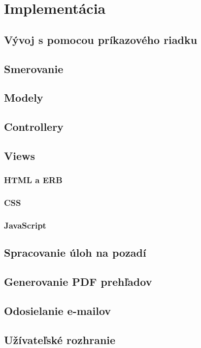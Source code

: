 \chapter{Implementácia}

\section{Vývoj s pomocou príkazového riadku}

\section{Smerovanie}

\section{Modely}

\section{Controllery}

\section{Views}
\subsection{HTML a ERB}
\subsection{CSS}
\subsection{JavaScript}

\section{Spracovanie úloh na pozadí}

\section{Generovanie PDF prehľadov}
\section{Odosielanie e-mailov}

\clearpage
\section{Užívateľské rozhranie}

